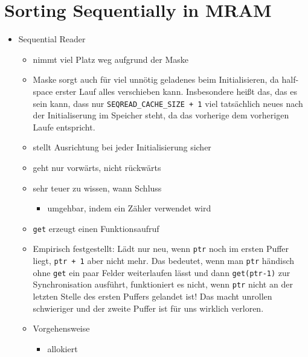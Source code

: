 \chapter{Sorting Sequentially in MRAM}
\label{sec:mram}

\begin{itemize}
	\item
	Sequential Reader
	\begin{itemize}
		\item
		nimmt viel Platz weg aufgrund der Maske

		\item
		Maske sorgt auch für viel unnötig geladenes beim Initialisieren, da half-space \MS{} erster Lauf alles verschieben kann.
		Insbesondere heißt das, das es sein kann, dass nur \lstinline|SEQREAD_CACHE_SIZE + 1| viel tatsächlich neues nach der Initialiserung im Speicher steht, da das vorherige dem vorherigen Laufe entspricht.

		\item
		stellt Ausrichtung bei jeder Initialisierung sicher

		\item
		geht nur vorwärts, nicht rückwärts

		\item
		sehr teuer zu wissen, wann Schluss
		\begin{itemize}
			\item
			umgehbar, indem ein Zähler verwendet wird
		\end{itemize}

		\item
		\lstinline|get| erzeugt einen Funktionsaufruf

		\item
		Empirisch festgestellt:
		Lädt nur neu, wenn \lstinline|ptr| noch im ersten Puffer liegt, \lstinline|ptr + 1| aber nicht mehr.
		Das bedeutet, wenn man \lstinline|ptr| händisch ohne \lstinline|get| ein paar Felder weiterlaufen lässt und dann \lstinline|get(ptr-1)| zur Synchronisation ausführt, funktioniert es nicht, wenn \lstinline|ptr| nicht an der letzten Stelle des ersten Puffers gelandet ist!
		Das macht unrollen schwieriger und der zweite Puffer ist für uns wirklich verloren.

		\item
		Vorgehensweise
		\begin{itemize}
			\item
			allokiert
		\end{itemize}
	\end{itemize}


\end{itemize}
